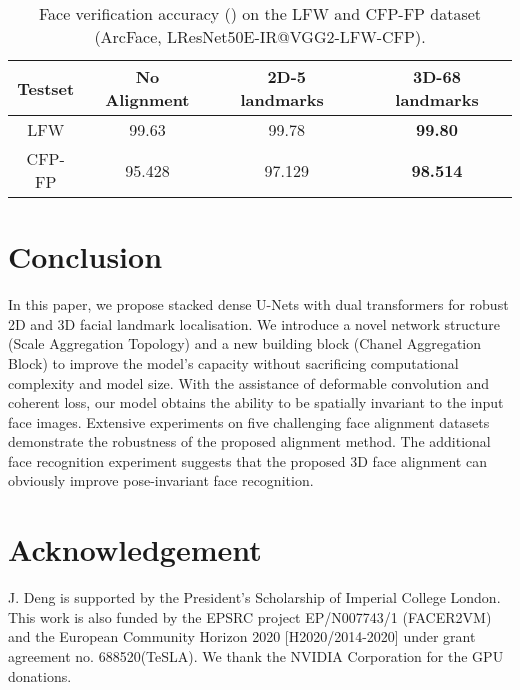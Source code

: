 \documentclass{bmvc2k}
\begin{document}
\begin{table}[h!]
\begin{center}
\begin{tabular}{c|c|c|c}
\hline
Testset       & No Alignment   & 2D-5 landmarks~\cite{zhang2016joint} & 3D-68 landmarks\\
\hline
LFW   &  99.63 & 99.78  & {\bf 99.80} \\
CFP-FP &  95.428 & 97.129 & {\bf 98.514} \\
\hline
\end{tabular}
\end{center}
\vspace{-2mm}
\caption{Face verification accuracy () on the LFW and CFP-FP dataset (ArcFace, LResNet50E-IR@VGG2-LFW-CFP).}
\vspace{-6mm}
\label{table:facerecognition}
\end{table}

\section{Conclusion}

In this paper, we propose stacked dense U-Nets with dual transformers for robust 2D and 3D facial landmark localisation.
We introduce a novel network structure (Scale Aggregation Topology) and a new building block (Chanel Aggregation Block) to improve the model's capacity without sacrificing computational complexity and model size. With the assistance of deformable convolution and coherent loss, our model obtains the ability to be spatially invariant to the input face images. Extensive experiments on five challenging face alignment datasets demonstrate the robustness of the proposed alignment method. The additional face recognition experiment suggests that the proposed 3D face alignment can obviously improve pose-invariant face recognition.



\section{Acknowledgement}

J. Deng is supported by the President's Scholarship of Imperial College London. This work is also funded by the EPSRC project EP/N007743/1 (FACER2VM) and the European Community Horizon 2020 [H2020/2014-2020] under grant agreement no. 688520(TeSLA). We thank the NVIDIA Corporation for the GPU donations.


\end{document}
